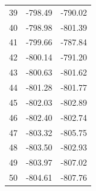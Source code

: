 \begin{tabular}{lrr}
39 & -798.49 & -790.02 \\
40 & -798.98 & -801.39 \\
41 & -799.66 & -787.84 \\
42 & -800.14 & -791.20 \\
43 & -800.63 & -801.62 \\
44 & -801.28 & -801.77 \\
45 & -802.03 & -802.89 \\
46 & -802.40 & -802.74 \\
47 & -803.32 & -805.75 \\
48 & -803.50 & -802.93 \\
49 & -803.97 & -807.02 \\
50 & -804.61 & -807.76 \\
\hline
\end{tabular}
